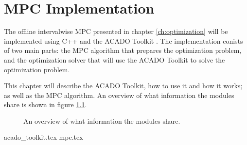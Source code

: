 \chapter{MPC Implementation}

The offline intervalwise MPC presented in chapter \ref{ch:optimization} will be implemented using C++ and the ACADO Toolkit \cite{acadoHOUSKA}. The implementation conists of two main parts: the MPC algorithm that prepares the optimization problem, and the optimization solver that will use the ACADO Toolkit to solve the optimization problem.

This chapter will describe the ACADO Toolkit, how to use it and how it works; as well as the MPC algorithm. An overview of what information the modules share is shown in figure \ref{fig:sys_overview}.

\begin{figure}[h]
	\centering
	\caption{An overview of what information the modules share.}
	\label{fig:sys_overview}
\end{figure}
	
{acado_toolkit.tex}
{mpc.tex}